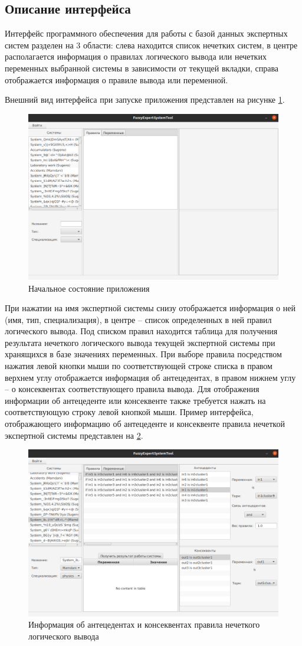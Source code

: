 \subsection{Описание интерфейса}
Интерфейс программного обеспечения для работы с базой данных  экспертных систем разделен на 3 области: слева находится список нечетких систем, в центре располагается информация о правилах логического вывода или нечетких переменных выбранной системы в зависимости от текущей вкладки, справа отображается информация о правиле вывода или переменной.

Внешний вид интерфейса при запуске приложения представлен на рисунке \ref{fig:mainmenu}. 
\begin{figure}[H]
	\centering
	\includegraphics[width=0.7\linewidth]{img/main_menu}
	\caption{Начальное состояние приложения}
	\label{fig:mainmenu}
\end{figure}

При нажатии на имя экспертной системы снизу отображается информация о ней (имя, тип, специализация), в центре -- список определенных в ней правил логического вывода. Под списком правил находится таблица для получения результата нечеткого логического вывода текущей экспертной системы при хранящихся в базе значениях переменных. При выборе правила посредством нажатия левой кнопки мыши по соответствующей строке списка в правом верхнем углу отображается информация об антецедентах, в правом нижнем углу -- о консеквентах соответствующего правила вывода. Для отображения информации об антецеденте или консеквенте также требуется нажать на соответствующую строку левой кнопкой мыши. Пример интерфейса, отображающего информацию об антецеденте и консеквенте правила нечеткой экспертной системы представлен на \ref{fig:ruleinfo}.

\begin{figure}[H]
	\centering
	\includegraphics[width=0.7\linewidth]{img/ruleInfo}
	\caption{Информация об антецедентах и консеквентах правила нечеткого логического вывода}
	\label{fig:ruleinfo}
\end{figure}

